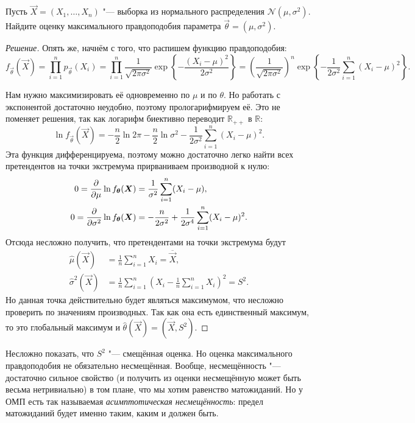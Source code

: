 \begin{problem}
    Пусть $\vec{X} = (X_{1}, \ldots, X_{n})$ "--- выборка из нормального распределения $\mathcal{N}(\mu, \sigma^{2})$. Найдите оценку максимального правдоподобия параметра $\vec{\theta} = (\mu, \sigma^{2})$.
\end{problem}
\begin{proof}[Решение]
    Опять же, начнём с того, что распишем функцию правдоподобия:
    \[
        f_{\vec{\theta}}(\vec{X}) 
        = \prod_{i = 1}^{n} p_{\vec{\theta}}(X_{i}) 
        = \prod_{i = 1}^{n} \frac{1}{\sqrt{2\pi\sigma^{2}}}\exp\left\{-\frac{(X_{i} - \mu)^{2}}{2\sigma^{2}}\right\}
        = \left(\frac{1}{\sqrt{2\pi\sigma^{2}}}\right)^{n} \exp\left\{-\frac{1}{2\sigma^{2}} \sum_{i = 1}^{n} (X_{i} - \mu)^{2}\right\}.
    \]
    
    Нам нужно максимизировать её одновременно по $\mu$ и по $\theta$. Но работать с экспонентой достаточно неудобно, поэтому прологарифмируем её. Это не поменяет решения, так как логарифм биективно переводит $\mathbb{R}_{++}$ в $\mathbb{R}$:
    \[
        \ln f_{\vec{\theta}}(\vec{X})
        = -\frac{n}{2}\ln 2\pi - \frac{n}{2}\ln \sigma^{2} - \frac{1}{2\sigma^{2}} \sum_{i = 1}^{n} (X_{i} - \mu)^{2}.
    \]
    Эта функция дифференцируема, поэтому можно достаточно легко найти всех претендентов на точки экстремума прирваниваем производной к нулю:
    \begin{align*}
        0 = \pdv{\mu} \ln f_{\bm{\theta}}(\bm{X})
        &= \frac{1}{\sigma^{2}}\sum_{i = 1}^{n} (X_{i} - \mu), \\
        0 = \pdv{\sigma^{2}} \ln f_{\bm{\theta}}(\bm{X})
        &= -\frac{n}{2\sigma^{2}} + \frac{1}{2\sigma^{4}}\sum_{i = 1}^{n} (X_{i} - \mu)^{2}.
    \end{align*}
    Отсюда несложно получить, что претендентами на точки экстремума будут 
    \begin{align*}
        \hat{\mu}(\vec{X}) 
        &= \frac{1}{n}\sum_{i = 1}^{n} X_{i} = \overline{\vec{X}}, \\
        \hat{\sigma}^{2}(\vec{X})
        &= \frac{1}{n}\sum_{i = 1}^{n} \left(X_{i} - \frac{1}{n}\sum_{i = 1}^{n} X_{i}\right)^{2} = S^{2}.
    \end{align*}
    Но данная точка действительно будет являться максимумом, что несложно проверить по значениям производных. Так как она есть единственный максимум, то это глобальный максимум и $\hat{\theta}(\vec{X}) = (\overline{\vec{X}}, S^{2})$.
\end{proof}
\begin{remark}
    Несложно показать, что $S^{2}$ "--- смещённая оценка. Но оценка максимального правдоподобия не обязательно несмещённая. Вообще, несмещённость "--- достаточно сильное свойство (и получить из оценки несмещённую может быть весьма нетривиально) в том плане, что мы хотим равенство матожиданий. Но у ОМП есть так называемая \emph{асимптотическая несмещённость}: предел матожиданий будет именно таким, каким и должен быть.
\end{remark}


